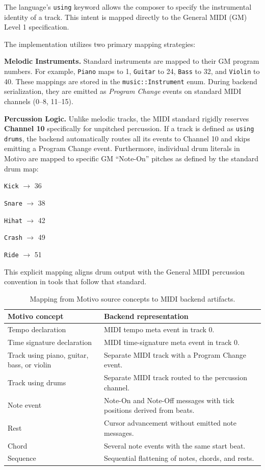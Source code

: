 The language's \texttt{using} keyword allows the composer to specify the instrumental identity of a track.
This intent is mapped directly to the General MIDI (GM) Level 1 specification.

The implementation utilizes two primary mapping strategies:

\noindent \textbf{Melodic Instruments.} Standard instruments are mapped to their GM program numbers.
For example, \texttt{Piano} maps to 1, \texttt{Guitar} to 24, \texttt{Bass} to 32, and \texttt{Violin} to 40.
These mappings are stored in the \texttt{music::Instrument} enum.
During backend serialization, they are emitted as \textit{Program Change} events on standard MIDI channels (0--8,
11--15).

\noindent \textbf{Percussion Logic.} Unlike melodic tracks, the MIDI standard rigidly reserves \textbf{Channel 10}
specifically for unpitched percussion.
If a track is defined as \texttt{using drums}, the backend automatically routes all its events to Channel 10 and
skips emitting a Program Change event.
Furthermore, individual drum literals in Motivo are mapped to specific GM ``Note-On'' pitches as defined by the
standard drum map:

\noindent \texttt{Kick} $\rightarrow$ 36

\noindent \texttt{Snare} $\rightarrow$ 38

\noindent \texttt{Hihat} $\rightarrow$ 42

\noindent \texttt{Crash} $\rightarrow$ 49

\noindent \texttt{Ride} $\rightarrow$ 51

This explicit mapping aligns drum output with the General MIDI percussion convention in tools that follow that standard.

\begin{table}[htbp]
  \centering
  \renewcommand{\arraystretch}{1.3}
  \begin{tabularx}{\textwidth}{>{\raggedright\arraybackslash}p{3.4cm}X}
    \toprule
    \textbf{Motivo concept} & \textbf{Backend representation} \\
    \midrule
    Tempo declaration & MIDI tempo meta event in track 0. \\
    Time signature declaration & MIDI time-signature meta event in track 0. \\
    Track using piano, guitar, bass, or violin & Separate MIDI track with a Program Change event. \\
    Track using drums & Separate MIDI track routed to the percussion channel. \\
    Note event & Note-On and Note-Off messages with tick positions derived from beats. \\
    Rest & Cursor advancement without emitted note messages. \\
    Chord & Several note events with the same start beat. \\
    Sequence & Sequential flattening of notes, chords, and rests. \\
    \bottomrule
  \end{tabularx}
  \caption{Mapping from Motivo source concepts to MIDI backend artifacts.}\label{tab:motivo-midi-mapping}
\end{table}

